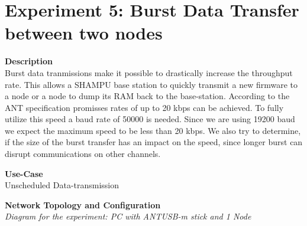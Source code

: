 \section{Experiment 5: Burst Data Transfer between two nodes}
\begin{description} 
	\item{\textbf{Description}} \hfill \\ Burst data tranmissions make it possible to drastically increase the throughput rate. This allows a SHAMPU base station to quickly transmit a new firmware to a node or a node to dump its RAM back to the base-station.	According to the ANT specification promisses rates of up to 20 kbps can be achieved. To fully utilize this speed a baud rate of 50000 is needed. Since we are using 19200 baud we expect the maximum speed to be less than 20 kbps. We also try to determine, if the size of the burst transfer has an impact on the speed, since longer burst can disrupt communications on other channels.
	\item{\textbf{Use-Case}} \hfill \\ Unscheduled Data-transmission
	\item{\textbf{Network Topology and Configuration}} \hfill \\ \textit{Diagram for the experiment: PC with ANTUSB-m stick and 1 Node} \\


\end{description}
